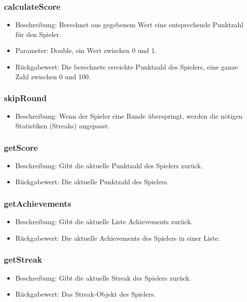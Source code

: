 \documentclass[a4paper]{scrreprt}
\begin{document}
    \subsubsection{calculateScore}
    \begin{itemize}
        \item Beschreibung: Berechnet aus gegebenem Wert eine entsprechende Punktzahl für den Spieler.
        \item Parameter: Double, ein Wert zwischen 0 und 1.
        \item Rückgabewert: Die berechnete erreichte Punktzahl des Spielers, eine ganze Zahl zwischen 0 und 100.
    \end{itemize}
    \subsubsection{skipRound}
    \begin{itemize}
        \item Beschreibung: Wenn der Spieler eine Runde überspringt, werden die nötigen Statistiken (Streaks) angepasst.
    \end{itemize}
    \subsubsection{getScore}
    \begin{itemize}
        \item Beschreibung: Gibt die aktuelle Punktzahl des Spielers zurück.
        \item Rückgabewert: Die aktuelle Punktzahl des Spielers.
    \end{itemize}
    \subsubsection{getAchievements}
    \begin{itemize}
        \item Beschreibung: Gibt die aktuelle Liste Achievements zurück.
        \item Rückgabewert: Die aktuelle Achievements des Spielers in einer Liste.
    \end{itemize}
    \subsubsection{getStreak}
    \begin{itemize}
        \item Beschreibung: Gibt die aktuelle Streak des Spielers zurück.
        \item Rückgabewert: Das Streak-Objekt des Spielers.
    \end{itemize}
\end{document}
